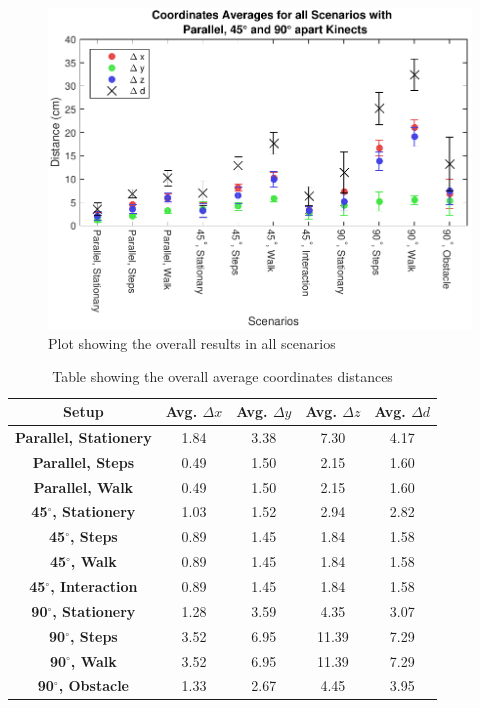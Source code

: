\begin{figure}[!htb]
  \centering

  \includegraphics[width=0.8\linewidth]{figs/Coordinates_All}

  \caption{Plot showing the overall results in all scenarios}

  \label{fig:results_overall}
\end{figure}

\begin{table}[!h]
  \centering

  \begin{tabulary}{0.5\linewidth}{||c c c c c||} 
  \hline
  \textbf{Setup} & Avg. $\Delta x$ & Avg. $\Delta y$ & Avg. $\Delta z$ & Avg. $\Delta d$ \\ [0.5ex] 
  \hline\hline
  \textbf{Parallel, Stationery} & 1.84 & 3.38 & 7.30 & 4.17 \\
  \hline
  \textbf{Parallel, Steps} & 0.49 & 1.50 & 2.15 & 1.60 \\
  \hline
  \textbf{Parallel, Walk} & 0.49 & 1.50 & 2.15 & 1.60 \\
  \hline
  \textbf{45$^{\circ}$, Stationery} & 1.03 & 1.52 & 2.94 & 2.82 \\
  \hline
  \textbf{45$^{\circ}$, Steps} & 0.89 & 1.45 & 1.84 & 1.58 \\
  \hline
  \textbf{45$^{\circ}$, Walk} & 0.89 & 1.45 & 1.84 & 1.58 \\
  \hline
  \textbf{45$^{\circ}$, Interaction} & 0.89 & 1.45 & 1.84 & 1.58 \\
  \hline
  \textbf{90$^{\circ}$, Stationery} & 1.28 & 3.59 & 4.35 & 3.07 \\
  \hline
  \textbf{90$^{\circ}$, Steps} & 3.52 & 6.95 & 11.39 & 7.29 \\
  \hline
  \textbf{90$^{\circ}$, Walk} & 3.52 & 6.95 & 11.39 & 7.29 \\
  \hline
  \textbf{90$^{\circ}$, Obstacle} & 1.33 & 2.67 & 4.45 & 3.95 \\
  \hline
  \end{tabulary}
  
  \caption{Table showing the overall average coordinates distances}
  
  \label{table:overall_coordinates_values}
\end{table}



